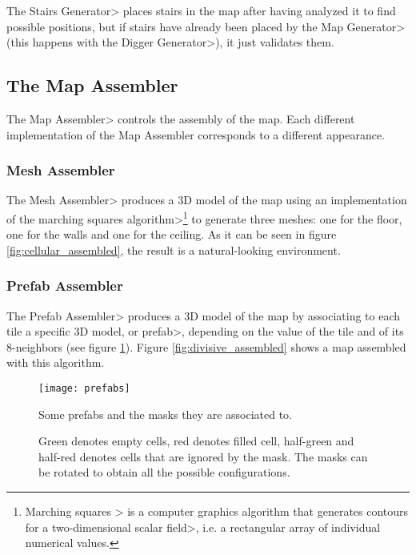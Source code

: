 The \<Stairs Generator> places stairs in the map after having analyzed it to find possible positions, but if stairs have already been placed by the \<Map Generator> (this happens with the \<Digger Generator>), it just validates them.


\subsection{The Map Assembler}

The \<Map Assembler> controls the assembly of the map. Each different implementation of the Map Assembler corresponds to a different appearance.


\subsubsection{Mesh Assembler}

The \<Mesh Assembler> produces a 3D model of the map using an implementation of the \<marching squares algorithm>\footnote{\<Marching squares > is a computer graphics algorithm that generates contours for a \<two-dimensional scalar field>, i.e. a rectangular array of individual numerical values.} to generate three meshes: one for the floor, one for the walls and one for the ceiling. As it can be seen in figure \ref{fig:cellular_assembled}, the result is a natural-looking environment.


\subsubsection{Prefab Assembler}

The \<Prefab Assembler> produces a 3D model of the map by associating to each tile a specific 3D model, or \<prefab>, depending on the value of the tile and of its 8-neighbors (see figure \ref{fig:prefabs}). Figure \ref{fig:divisive_assembled} shows a map assembled with this algorithm.

\begin{figure}
\centering
\texttt{[image: prefabs]}
\caption{Some prefabs and the masks they are associated to.}
\caption*{Green denotes empty cells, red denotes filled cell, half-green and half-red denotes cells that are ignored by the mask. The masks can be rotated to obtain all the possible configurations.}
\label{fig:prefabs}
\end{figure}

